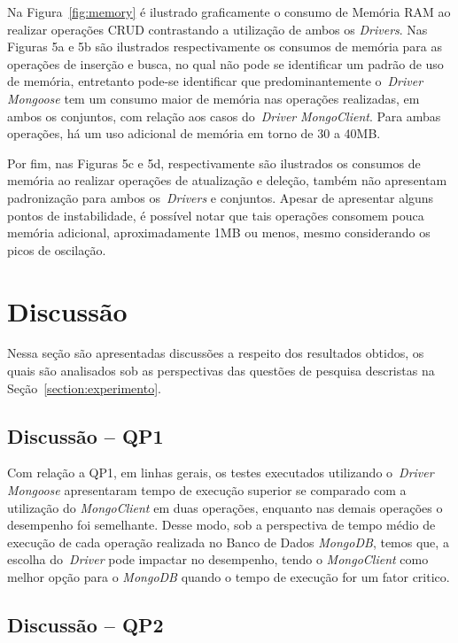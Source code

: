 \documentclass[12pt]{article}
\begin{document}
Na Figura~\ref{fig:memory} é ilustrado graficamente o consumo de Memória RAM ao realizar operações CRUD contrastando a utilização de ambos os \emph{Drivers}.
Nas Figuras 5a e 5b são ilustrados respectivamente os consumos de memória para as operações de inserção e busca, no qual não pode se identificar um padrão de uso de memória, entretanto pode-se identificar que predominantemente o~\emph{Driver} \emph{Mongoose} tem um consumo maior de memória nas operações realizadas, em ambos os conjuntos, com relação aos casos do~\emph{Driver} \emph{MongoClient}.
Para ambas operações, há um uso adicional de memória em torno de 30 a 40MB.

Por fim, nas Figuras 5c e 5d, respectivamente são ilustrados os consumos de memória ao realizar operações de atualização e deleção, também não apresentam padronização para ambos os~\emph{Drivers} e conjuntos. 
Apesar de apresentar alguns pontos de instabilidade, é possível notar que tais operações consomem pouca memória adicional, aproximadamente 1MB ou menos, mesmo considerando os picos de oscilação.

\section{Discussão}
\label{section:discussao}

Nessa seção são apresentadas discussões a respeito dos resultados obtidos, os quais são analisados sob as perspectivas das questões de pesquisa descristas na Seção~\ref{section:experimento}.

\subsection{Discussão -- QP1}
\label{q1}

Com relação a QP1, em linhas gerais, os testes executados utilizando o~\emph{Driver} \emph{Mongoose} apresentaram tempo de execução superior se comparado com a utilização do \emph{MongoClient} em duas operações, enquanto nas demais operações o desempenho foi semelhante.
Desse modo, sob a perspectiva de tempo médio de execução de cada operação realizada no Banco de Dados \emph{MongoDB}, temos que, a escolha do~\emph{Driver} pode impactar no desempenho, tendo o \emph{MongoClient} como melhor opção para o \emph{MongoDB} quando o tempo de execução for um fator critico.

\subsection{Discussão -- QP2}
\label{q2}
\end{document}
